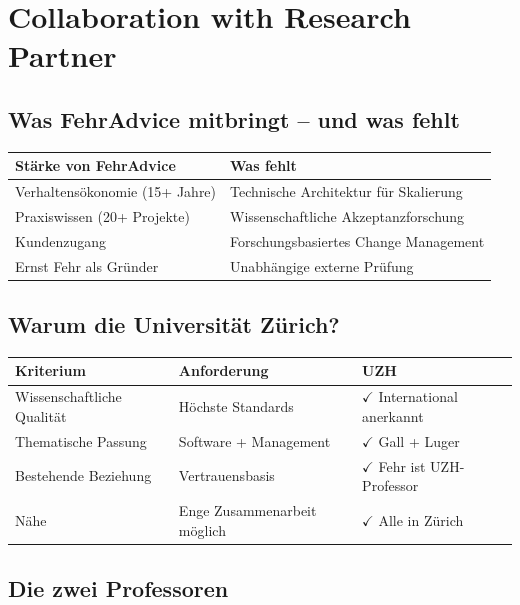 \documentclass[11pt,a4paper]{article}
\begin{document}
\section{Collaboration with Research Partner}

\subsection{Was FehrAdvice mitbringt -- und was fehlt}

\begin{table}[h]
\centering
\begin{tabular}{@{}L{6cm}L{7cm}@{}}
\toprule
\textbf{Stärke von FehrAdvice} & \textbf{Was fehlt} \\
\midrule
Verhaltensökonomie (15+ Jahre) & Technische Architektur für Skalierung \\
Praxiswissen (20+ Projekte) & Wissenschaftliche Akzeptanzforschung \\
Kundenzugang & Forschungsbasiertes Change Management \\
Ernst Fehr als Gründer & Unabhängige externe Prüfung \\
\bottomrule
\end{tabular}
\end{table}

\subsection{Warum die Universität Zürich?}

\begin{table}[h]
\centering
\begin{tabular}{@{}L{4cm}L{4cm}L{5cm}@{}}
\toprule
\textbf{Kriterium} & \textbf{Anforderung} & \textbf{UZH} \\
\midrule
Wissenschaftliche Qualität & Höchste Standards & $\checkmark$ International anerkannt \\
Thematische Passung & Software + Management & $\checkmark$ Gall + Luger \\
Bestehende Beziehung & Vertrauensbasis & $\checkmark$ Fehr ist UZH-Professor \\
Nähe & Enge Zusammenarbeit möglich & $\checkmark$ Alle in Zürich \\
\bottomrule
\end{tabular}
\end{table}

\subsection{Die zwei Professoren}
\end{document}
